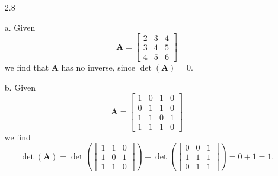 \documentclass[11pt]{article}
\theoremstyle{definition}
\theoremstyle{plain}
\theoremstyle{remark}
\begin{document}
\begin{enumerate}
    \item[2.8]

    \item[a.]
          Given
          \[
              \mathbf{A} =
              \begin{bmatrix}
                  2 & 3 & 4 \\
                  3 & 4 & 5 \\
                  4 & 5 & 6
              \end{bmatrix}
          \]
          we find that \(\mathbf{A}\) has no inverse, since \(\det(\mathbf{A}) = 0\).

    \item[b.]
          Given
          \[
              \mathbf{A} =
              \begin{bmatrix}
                  1 & 0 & 1 & 0 \\
                  0 & 1 & 1 & 0 \\
                  1 & 1 & 0 & 1 \\
                  1 & 1 & 1 & 0
              \end{bmatrix}
          \]
          we find
          \[
              \det(\mathbf{A}) = \det \left (
              \begin{bmatrix}
                      1 & 1 & 0 \\
                      1 & 0 & 1 \\
                      1 & 1 & 0
                  \end{bmatrix}
              \right )
              + \det \left (
              \begin{bmatrix}
                      0 & 0 & 1 \\
                      1 & 1 & 1 \\
                      0 & 1 & 1
                  \end{bmatrix}
              \right )
              = 0 + 1
              = 1.
          \]


\end{enumerate}
\end{document}
